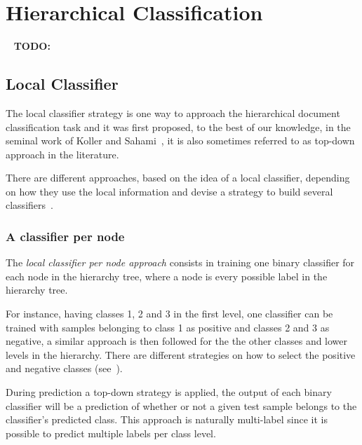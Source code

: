 \documentclass[11pt,a4paper]{article}
\begin{document}


\section{Hierarchical Classification}\label{hierarchical-clf}


\ \newline
\textbf{TODO:}
\ \newline


\subsection{Local Classifier}

The local classifier strategy is one way to approach the hierarchical document classification task
and it was first proposed, to the best of our knowledge, in the seminal work of Koller and
Sahami~, it is also sometimes referred to as top-down
approach in the literature.

There are different approaches, based on the idea of a local classifier, depending on how they use
the local information and devise a strategy to build several classifiers~\cite{Silla:2011:SHC:1937796.1937884}.


\subsubsection{A classifier per node} %
The \textit{local classifier per node approach} consists in training one binary classifier for each
node in the hierarchy tree, where a node is every possible label in the hierarchy tree.

For instance, having classes 1, 2 and 3 in the first level, one classifier can be trained with
samples belonging to class 1 as positive and classes 2 and 3 as negative, a similar approach is then
followed for the the other classes and lower levels in the hierarchy. There are different strategies
on how to select the positive and negative classes (see~\cite{}).

During prediction a top-down strategy is applied, the output of each binary classifier will be a
prediction of whether or not a given test sample belongs to the classifier’s predicted class. This approach
is naturally multi-label since it is possible to predict multiple labels per class level.
\end{document}
